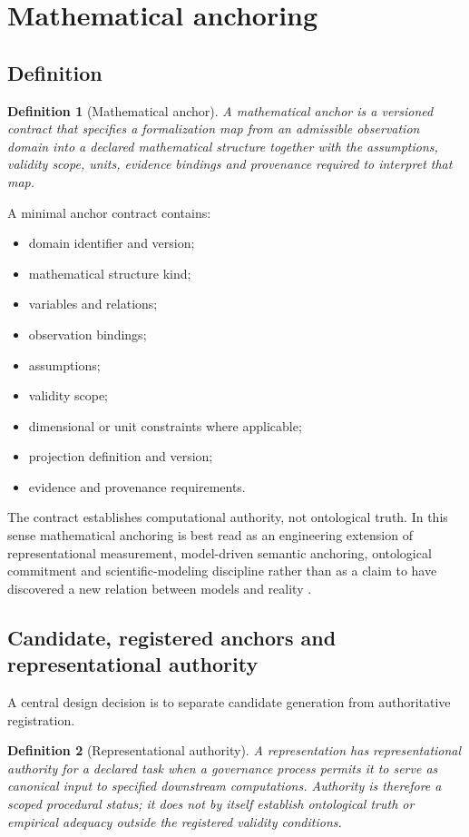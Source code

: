 \documentclass[11pt,a4paper]{article}
\newtheorem{definition}{Definition}
\begin{document}
\section{Mathematical anchoring}
\subsection{Definition}
\begin{definition}[Mathematical anchor]
A mathematical anchor is a versioned contract that specifies a formalization map from an admissible observation domain into a declared mathematical structure together with the assumptions, validity scope, units, evidence bindings and provenance required to interpret that map.
\end{definition}

A minimal anchor contract contains:
\begin{itemize}
    \item domain identifier and version;
    \item mathematical structure kind;
    \item variables and relations;
    \item observation bindings;
    \item assumptions;
    \item validity scope;
    \item dimensional or unit constraints where applicable;
    \item projection definition and version;
    \item evidence and provenance requirements.
\end{itemize}

The contract establishes computational authority, not ontological truth. In this sense mathematical anchoring is best read as an engineering extension of representational measurement, model-driven semantic anchoring, ontological commitment and scientific-modeling discipline rather than as a claim to have discovered a new relation between models and reality \cite{scottSuppes1958,krantz1971,chen2005transform,jarrarMeersman2002,suarez2004}.

\subsection{Candidate, registered anchors and representational authority}
A central design decision is to separate candidate generation from authoritative registration.

\begin{definition}[Representational authority]
A representation has representational authority for a declared task when a governance process permits it to serve as canonical input to specified downstream computations. Authority is therefore a scoped procedural status; it does not by itself establish ontological truth or empirical adequacy outside the registered validity conditions.
\end{definition}
\end{document}

